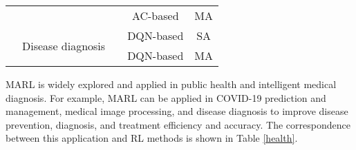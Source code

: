 \documentclass[acmsmall]{acmart}
\begin{document}
\begin{table}[]
\begin{tabularx}{\textwidth}{|XX|c|c|c|}
\multicolumn{1}{|X|}{}                                                                 &                                                    & \cite{10.1007/978-3-030-78191-0_59}                                                                                      & AC-based \cite{ac}     & MA       \\ \cline{2-5} 
\multicolumn{1}{|X|}{}                                                                 & \multirow{2}{=}{\centering Disease diagnosis}                 & \cite{pmlr-v68-ling17a,   ling-etal-2017-learning,tang2016inquire}                                                       & DQN-based \cite{dqn}   & SA       \\ \cline{3-5} 
\multicolumn{1}{|X|}{}                                                                 &                                                    & \cite{10010747}                                                                                                          & DQN-based \cite{dqn}   & MA       \\ \hline
\end{tabularx}
\end{table}

MARL is widely explored and applied in public health and intelligent medical diagnosis. For example, MARL can be applied in COVID-19 prediction and management, medical image processing, and disease diagnosis to improve disease prevention, diagnosis, and treatment efficiency and accuracy. The correspondence between this application and RL methods is shown in Table \ref{health}.
\end{document}
